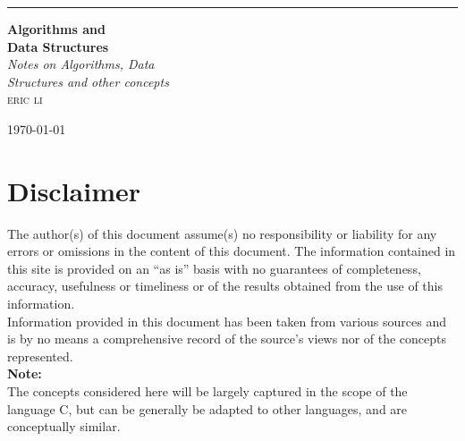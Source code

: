 \documentclass[11pt]{article}
\begin{document}
\begin{titlepage} %

	\raggedleft %
	\rule{1pt}{\textheight} %
	\hspace{0.05\textwidth} %
	\parbox[b]{0.75\textwidth}{ %
        {\Huge\bfseries Algorithms and\\[0.5\baselineskip]Data Structures }\\[2\baselineskip] %
        
        {\large\textit{Notes on Algorithms, Data \\[0.5\baselineskip]Structures and other concepts}}\\[4\baselineskip] %
        
        {\Large\textsc{eric li}} %
        
        \vspace{0.5\textheight} %
        
        {\noindent\large\today}\\[\baselineskip]
    }
\end{titlepage}
\tableofcontents
\newpage
\section{Disclaimer}
The author(s) of this document assume(s) no responsibility or liability for any errors or omissions in the content of this document. The information contained in this site is provided on an “as is” basis with no guarantees of completeness, accuracy, usefulness or timeliness or of the results obtained from the use of this information.\\[0.5\baselineskip]
Information provided in this document has been taken from various sources and is by no means a comprehensive record of the source's views nor of the concepts represented.\\[1\baselineskip]
\textbf{Note:}\\
The concepts considered here will be largely captured in the scope of the language C, but can be generally be adapted to other languages, and are conceptually similar.
\end{document}
